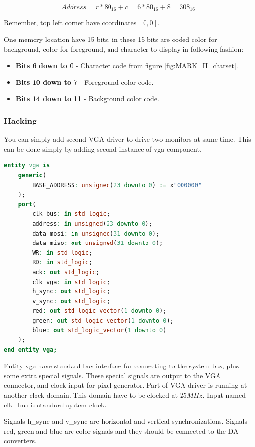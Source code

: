 $$
    Address = r * 80_{16} + c = 6 * 80_{16} + 8 = 308_{16}
$$

Remember, top left corner have coordinates $[0, 0]$.

One memory location have 15 bits, in these 15 bits are coded color for background,
color for foreground, and character to display in following fashion:

\begin{itemize}
    \item \textbf{Bits 6 down to 0} - Character code from figure \ref{fig:MARK_II_charset}.
    \item \textbf{Bits 10 down to 7} - Foreground color code.
    \item \textbf{Bits 14 down to 11} - Background color code.
\end{itemize}

\subsubsection{Hacking}

You can simply add second VGA driver to drive two monitors at same time. This
can be done simply by adding second instance of vga component.

\begin{lstlisting}[language=VHDL, frame=single]
entity vga is
    generic(
        BASE_ADDRESS: unsigned(23 downto 0) := x"000000"
    );
    port(
        clk_bus: in std_logic;
        address: in unsigned(23 downto 0);
        data_mosi: in unsigned(31 downto 0);
        data_miso: out unsigned(31 downto 0);
        WR: in std_logic;
        RD: in std_logic;
        ack: out std_logic;
        clk_vga: in std_logic;
        h_sync: out std_logic;
        v_sync: out std_logic;
        red: out std_logic_vector(1 downto 0);
        green: out std_logic_vector(1 downto 0);
        blue: out std_logic_vector(1 downto 0)
    );
end entity vga;
\end{lstlisting}

Entity vga have standard bus interface for connecting to the system bus, plus
some extra special signals. These special signals are output to the VGA connector,
and clock input for pixel generator. Part of VGA driver is running at another
clock domain. This domain have to be clocked at $25MHz$. Input named clk\_bus
is standard system clock.

Signals h\_sync and v\_sync are horizontal and vertical synchronizations. Signals
red, green and blue are color signals and they should be connected to the DA converters.
